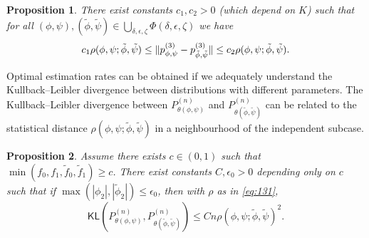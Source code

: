 \documentclass[journal]{IEEEtran}
\newtheorem{proposition}{Proposition}
\newcommand{\sgn}{\mathrm{sgn}}
\newcommand{\1}{\boldsymbol{1}}
\newcommand{\KL}{\mathsf{KL}}
\DeclarePairedDelimiter{\ip}{\langle}{\rangle}
\DeclarePairedDelimiter{\norm}{\lVert}{\rVert}
\begin{document}
\begin{proposition}
		There exist constants $c_1,c_2>0$ (which depend on $K$) such that for all $(\phi,\psi),(\tilde{\phi},\tilde{\psi})\in \bigcup_{\delta,\epsilon,\zeta}\Phi(\delta,\epsilon,\zeta)$ we have
		\begin{equation*}
			c_1 \rho(\phi,\psi;\tilde{\phi},\tilde{\psi})\leq \norm{p_{\phi,\psi}^{(3)} - p_{\tilde{\phi},\tilde{\psi}}^{(3)}}%
			\leq c_2  \rho(\phi,\psi;\tilde{\phi},\tilde{\psi}).
		\end{equation*}
	\end{proposition}

	Optimal estimation rates can be obtained if we adequately understand %
	the Kullback--Leibler divergence between distributions with different parameters. The Kullback--Leibler divergence between $P^{(n)}_{\theta(\phi,\psi)}$ and $P^{(n)}_{\theta(\tilde{\phi},\tilde{\psi})}$ can be related to the statistical distance $\rho(\phi,\psi;\tilde{\phi},\tilde{\psi})$ in a neighbourhood of the independent subcase.

	\begin{proposition}
	\label{prop:kul}
	Assume there exists $c \in (0,1)$ such that $\min(f_0,f_1,\tilde{f}_0,\tilde{f}_1) \geq c$. There exist constants $C,\epsilon_0 > 0$ depending only on $c$ such that if $\max(|\phi_2|,|\tilde{\phi}_2|) \leq \epsilon_0$, then with $\rho$ as in \cref{eq:131},
	\begin{equation*}
	    \KL(P_{\theta(\phi,\psi)}^{(n)},P_{\theta(\tilde{\phi},\tilde{\psi})}^{(n)})%
	    \leq C n \rho(\phi,\psi;\tilde{\phi},\tilde{\psi})^2.
	\end{equation*}
	\label{kul:upper}
	\end{proposition}
\end{document}
